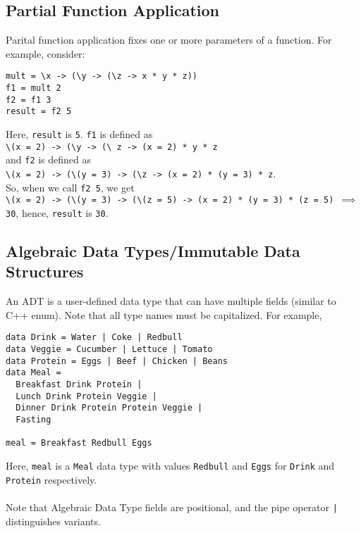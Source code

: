 \documentclass{article}
\begin{document}
\subsection{Partial Function Application}
Parital function application fixes one or more parameters of a
function. For example, consider:
\begin{verbatim}
mult = \x -> (\y -> (\z -> x * y * z))
f1 = mult 2
f2 = f1 3
result = f2 5
\end{verbatim}
Here, \texttt{result} is \texttt{5}. \texttt{f1} is defined as \\
\texttt{\textbackslash (x = 2) -> (\textbackslash y -> (\textbackslash
  z -> (x = 2) * y * z} \\
and \texttt{f2} is defined as \\
\texttt{\textbackslash (x = 2) -> (\textbackslash (y = 3) ->
  (\textbackslash z -> (x = 2) * (y = 3) * z}. \\
So, when we call \texttt{f2 5}, we get \\
\texttt{\textbackslash (x = 2) -> (\textbackslash (y = 3) ->
  (\textbackslash (z = 5) -> (x = 2) * (y = 3) * (z = 5) $\implies$
  30}, hence, \texttt{result} is \texttt{30}.





\subsection{Algebraic Data Types/Immutable Data Structures}
An ADT is a user-defined data type that can have multiple fields
(similar to C++ enum). Note that all type names must be capitalized.
For example,
\begin{verbatim}
data Drink = Water | Coke | Redbull
data Veggie = Cucumber | Lettuce | Tomato
data Protein = Eggs | Beef | Chicken | Beans
data Meal =
  Breakfast Drink Protein |
  Lunch Drink Protein Veggie |
  Dinner Drink Protein Protein Veggie |
  Fasting

meal = Breakfast Redbull Eggs
\end{verbatim}
Here, \texttt{meal} is a \texttt{Meal} data type with values
\texttt{Redbull} and \texttt{Eggs} for \texttt{Drink} and
\texttt{Protein} respectively. \\ \\
Note that Algebraic Data Type fields are positional, and the pipe operator
\texttt{|} distinguishes variants.
\end{document}
